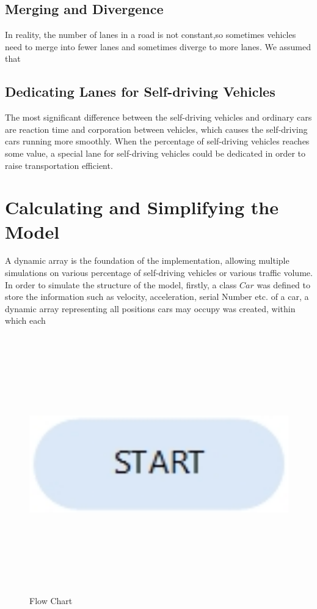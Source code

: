 \documentclass{icmmcm}
\begin{document}
\subsection{Merging and Divergence}
In reality, the number of lanes in a road is not constant,so sometimes vehicles need to merge into fewer lanes and sometimes diverge to more lanes. We assumed that
\subsection{Dedicating Lanes for Self-driving Vehicles}
The most significant difference between the self-driving vehicles and ordinary cars are reaction time and corporation between vehicles, which causes the self-driving cars running more smoothly. When the percentage of self-driving vehicles reaches some value, a special lane for self-driving vehicles could be dedicated in order to raise transportation efficient.

\section{Calculating and Simplifying the Model}
A dynamic array is the foundation of the implementation, allowing multiple simulations on various percentage of  self-driving vehicles or various traffic volume. In order to simulate the structure of the model, firstly, a class $Car$ was  defined to store the information such as velocity, acceleration, serial Number etc. of a car, a dynamic array representing all positions cars may occupy was created, within which each
\begin{figure}[!htp]
\centering
\includegraphics[height=11.1cm]{FlowChart1.jpg}
\caption{Flow Chart}
\end{figure}
\end{document}
